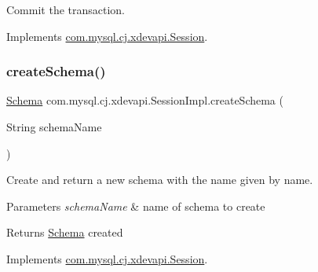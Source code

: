 Commit the transaction. 

Implements \mbox{\hyperlink{interfacecom_1_1mysql_1_1cj_1_1xdevapi_1_1_session_ada6a17d457c7b1387c094862e465dc01}{com.\+mysql.\+cj.\+xdevapi.\+Session}}.

\mbox{\label{classcom_1_1mysql_1_1cj_1_1xdevapi_1_1_session_impl_a21dd320f0e162d26784465aa6bb859ce}} 
\subsubsection{\texorpdfstring{create\+Schema()}{createSchema()}\hspace{0.1cm}{\footnotesize\ttfamily [1/2]}}
{\footnotesize\ttfamily \mbox{\hyperlink{interfacecom_1_1mysql_1_1cj_1_1xdevapi_1_1_schema}{Schema}} com.\+mysql.\+cj.\+xdevapi.\+Session\+Impl.\+create\+Schema (\begin{DoxyParamCaption}\item[{String}]{schema\+Name }\end{DoxyParamCaption})}

Create and return a new schema with the name given by name.


\begin{DoxyParams}{Parameters}
{\em schema\+Name} & name of schema to create \\
\hline
\end{DoxyParams}
\begin{DoxyReturn}{Returns}
\mbox{\hyperlink{interfacecom_1_1mysql_1_1cj_1_1xdevapi_1_1_schema}{Schema}} created 
\end{DoxyReturn}


Implements \mbox{\hyperlink{interfacecom_1_1mysql_1_1cj_1_1xdevapi_1_1_session_a09866b1dd34b22cfc24ef9517387da9f}{com.\+mysql.\+cj.\+xdevapi.\+Session}}.

\mbox{\label{classcom_1_1mysql_1_1cj_1_1xdevapi_1_1_session_impl_ae98234f9b7a73f758946297806aeb639}} 
